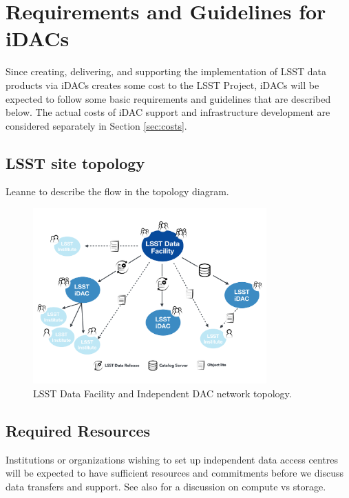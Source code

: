 
\section{Requirements and Guidelines for iDACs}\label{sec:reqs}
Since creating, delivering, and supporting the implementation of LSST data products via iDACs creates some cost to the LSST Project, iDACs will be expected to follow some basic requirements and guidelines that are described below.
The actual costs of iDAC support and infrastructure development are considered separately in Section \ref{sec:costs}.

\subsection{LSST site topology} \label{sec:topology}

{\color{red}Leanne to describe the flow in the topology diagram.} \newline

\begin{figure}
\begin{center}
\includegraphics[width=0.8\textwidth]{images_local/LSST-site-topology}
\caption{LSST Data Facility and Independent DAC network topology.  \label{fig:lsst-site-topology}}
\end{center}
\end{figure}

\subsection{Required Resources} \label{sec:resources}
Institutions or organizations wishing to set up independent data access centres will be expected to have
sufficient resources and commitments before we discuss data transfers and support.
See also  for a discussion on compute vs storage.

